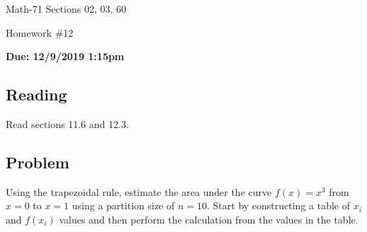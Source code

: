\documentclass[letterpaper,12pt,fleqn]{article}
\begin{document}
\begin{center}
  \large
  Math-71 Sections 02, 03, 60

  \Large
  Homework \#12

  \large\textbf{Due: 12/9/2019 1:15pm}
\end{center}

\subsection*{Reading}

Read sections 11.6 and 12.3.

\subsection*{Problem}

Using the trapezoidal rule, estimate the area under the curve \(f(x)=x^3\) from \(x=0\) to \(x=1\) using a partition
size of \(n=10\).  Start by constructing a table of \(x_i\) and \(f(x_i)\) values and then perform the calculation
from the values in the table.
\end{document}
